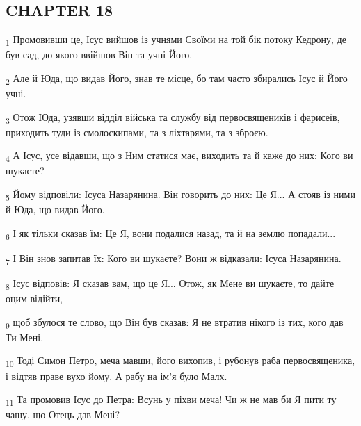 \subsection{CHAPTER 18}
\begin{tcolorbox}
\textsubscript{1} Промовивши це, Ісус вийшов із учнями Своїми на той бік потоку Кедрону, де був сад, до якого ввійшов Він та учні Його.
\end{tcolorbox}
\begin{tcolorbox}
\textsubscript{2} Але й Юда, що видав Його, знав те місце, бо там часто збирались Ісус й Його учні.
\end{tcolorbox}
\begin{tcolorbox}
\textsubscript{3} Отож Юда, узявши відділ війська та службу від первосвящеників і фарисеїв, приходить туди із смолоскипами, та з ліхтарями, та з зброєю.
\end{tcolorbox}
\begin{tcolorbox}
\textsubscript{4} А Ісус, усе відавши, що з Ним статися має, виходить та й каже до них: Кого ви шукаєте?
\end{tcolorbox}
\begin{tcolorbox}
\textsubscript{5} Йому відповіли: Ісуса Назарянина. Він говорить до них: Це Я... А стояв із ними й Юда, що видав Його.
\end{tcolorbox}
\begin{tcolorbox}
\textsubscript{6} І як тільки сказав їм: Це Я, вони подалися назад, та й на землю попадали...
\end{tcolorbox}
\begin{tcolorbox}
\textsubscript{7} І Він знов запитав їх: Кого ви шукаєте? Вони ж відказали: Ісуса Назарянина.
\end{tcolorbox}
\begin{tcolorbox}
\textsubscript{8} Ісус відповів: Я сказав вам, що це Я... Отож, як Мене ви шукаєте, то дайте оцим відійти,
\end{tcolorbox}
\begin{tcolorbox}
\textsubscript{9} щоб збулося те слово, що Він був сказав: Я не втратив нікого із тих, кого дав Ти Мені.
\end{tcolorbox}
\begin{tcolorbox}
\textsubscript{10} Тоді Симон Петро, меча мавши, його вихопив, і рубонув раба первосвященика, і відтяв праве вухо йому. А рабу на ім'я було Малх.
\end{tcolorbox}
\begin{tcolorbox}
\textsubscript{11} Та промовив Ісус до Петра: Всунь у піхви меча! Чи ж не мав би Я пити ту чашу, що Отець дав Мені?
\end{tcolorbox}
